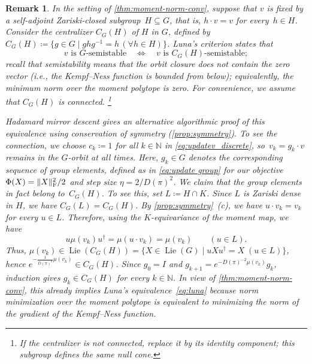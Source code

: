 \documentclass[11pt,letterpaper]{article}
\newtheorem{remark}[theorem]{Remark}\AddToHook{env/remark/begin}{\crefalias{theorem}{remark}}
\numberwithin{equation}{section}
\newcommand{\NN}{\mathbb{N}}
\DeclareMathOperator{\Lie}{Lie}
\DeclarePairedDelimiter\norm{\lVert}{\rVert}
\begin{document}
\begin{remark}\label{rem:Luna}
In the setting of \cref{thm:moment-norm-conv}, suppose that $v$ is fixed by a self-adjoint Zariski-closed subgroup~$H \subseteq G$, that is, $h \cdot v = v$ for every~$h\in H$.
Consider the \emph{centralizer} $C_G(H)$ of $H$ in $G$, defined by~$C_G(H) \coloneqq \{g\in G\mid ghg^{-1}=h\, (\forall h\in H)\}$.
Luna's criterion \cite[Cor.~2 and Rem.~1]{Luna-75} states that
\begin{equation}\label{eq:luna}
    v \text{ is $G$-semistable}\quad\iff\quad v\text{ is $C_G(H)$-semistable};
\end{equation}
recall that semistability means that the orbit closure does not contain the zero vector (i.e., the Kempf--Ness function is bounded from below); equivalently, the minimum norm over the moment polytope is zero.
For convenience, we assume that $C_G(H)$ is connected.%
\footnote{If the centralizer is not connected, replace it by its identity component; this subgroup defines the same null cone.}

Hadamard mirror descent gives an alternative \emph{algorithmic} proof of this equivalence using conservation of symmetry (\cref{prop:symmetry}).
To see the connection, we choose $c_k \coloneqq 1$ for all $k\in\NN$ in \cref{eq:updatev_discrete}, so~$v_{k} = g_k\cdot v$ remains in the $G$-orbit at all times.
Here, $g_k \in G$ denotes the corresponding sequence of group elements, defined as in \cref{eq:update group} for our objective $\Phi(X)=\norm{X}_{\mathrm{F}}^2/2$ and step size $\eta = 2/D(\pi)^2$.
We claim that the group elements in fact belong to~$C_G(H)$.
To see this, set $L\coloneqq H\cap K$.
Since $L$ is Zariski dense in $H$, we have $C_G(L) = C_G(H)$.
By \cref{prop:symmetry}~(c), we have $u\cdot v_k=v_k$ for every $u\in L$.
Therefore, using the $K$-equivariance of the moment map, we have
\[
    u \mu(v_k) u^{\dag} = \mu(u\cdot v_k) = \mu(v_k) \qquad (u\in L).
\]
Thus, $\mu(v_k)\in\Lie(C_G(H))=\{X\in\Lie(G)\mid u X u^\dag=X\; (u\in L)\}$, hence $e^{-\frac1{D(\pi)^2}\mu(v_k)} \in C_G(H)$.
Since $g_0=I$ and $g_{k+1}=e^{-D(\pi)^{-2}\mu(v_k)} g_k$, induction gives $g_k\in C_G(H)$ for every $k\in\NN$.
In view of \cref{thm:moment-norm-conv}, this already implies Luna's equivalence~\eqref{eq:luna} because norm minimization over the moment polytope is equivalent to minimizing the norm of the gradient of the Kempf--Ness function.


\end{remark}
\end{document}
